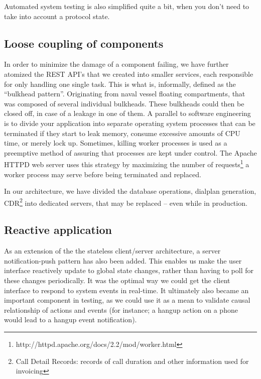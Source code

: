 \noindent Automated system testing is also simplified quite a bit, when you don't need to take into account a protocol state.

\subsection{Loose coupling of components} 
In order to minimize the damage of a component failing, we have further atomized the REST API's that we created into smaller services, each responsible for only handling one single task. This is what is, informally, defined as the ``bulkhead pattern''. Originating from naval vessel floating compartments, that was composed of several individual bulkheads. These bulkheads could then be closed off, in case of a leakage in one of them. A parallel to software engineering is to divide your application into separate operating system processes that can be terminated if they start to leak memory, consume excessive amounts of CPU time, or merely lock up. Sometimes, killing worker processes is used as a preemptive method of assuring that processes are kept under control. The Apache HTTPD web server uses this strategy by maximizing the number of requests\footnote{http://httpd.apache.org/docs/2.2/mod/worker.html} a worker process may serve before being terminated and replaced.\smallskip

\noindent In our architecture, we have divided the database operations, dialplan generation, CDR\footnote{Call Detail Records: records of call duration and other information used for invoicing} into dedicated servers, that may be replaced -- even while in production.

\subsection{Reactive application}
\label{ssec:server_notifications}
As an extension of the the stateless client/server architecture, a server notification-push pattern has also been added. This enables us make the user interface reactively update to global state changes, rather than having to poll for these changes periodically. It was the optimal way we could get the client interface to respond to system events in real-time. It ultimately also became an important component in testing, as we could use it as a mean to validate causal relationship of actions and events (for instance; a hangup action on a phone would lead to a hangup event notification).

